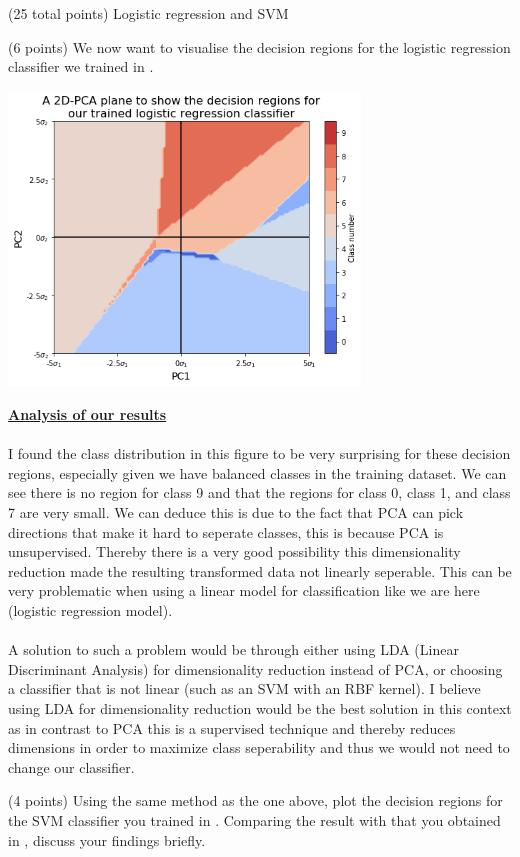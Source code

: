 \documentclass[12pt]{article}
\begin{document}
\begin{question}{(25 total points) Logistic regression and SVM}
\begin{subquestion}{(6 points)
       We now want to visualise the decision regions for the logistic
       regression classifier we trained in .
     }
      \begin{answerbox}{35em}
        \begin{center}
         \includegraphics[width=0.7\textwidth]{images/q23.png}
        \end{center}
        \textbf{\footnotesize{\underline{Analysis of our results}}}\\
\\
        \scriptsize{
        I found the class distribution in this figure to be very surprising for these decision regions, especially given we have balanced classes in the training dataset. We can see there is no region for class 9 and that the regions for class 0, class 1, and class 7 are very small. We can deduce this is due to the fact that PCA can pick directions that make it hard to seperate classes, this is because PCA is unsupervised. Thereby there is a very good possibility this dimensionality reduction made the resulting transformed data not linearly seperable. This can be very problematic when using a linear model for classification like we are here (logistic regression model).\\
\\
        A solution to such a problem would be through either using LDA (Linear Discriminant Analysis) for dimensionality reduction instead of PCA, or choosing a classifier that is not linear (such as an SVM with an RBF kernel). I believe using LDA for dimensionality reduction would be the best solution in this context as in contrast to PCA this is a supervised technique and thereby reduces dimensions in order to maximize class seperability and thus we would not need to change our classifier. 
        }
      \end{answerbox}
  


   \end{subquestion}
   \begin{subquestion}{(4 points)
       Using the same method as the one above, plot the decision regions for
       the SVM classifier you trained in .
       Comparing the result with that you obtained in , discuss your
       findings briefly.
     } \label{Q2.4}
   


\end{subquestion}
\end{question}
\end{document}
